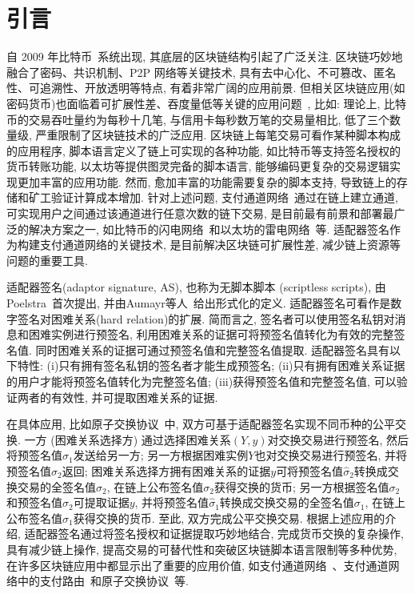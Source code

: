 \documentclass[review]{jcr}
\begin{document}

\section{引言}
自 2009 年比特币~\cite{Nak08}系统出现, 其底层的区块链结构引起了广泛关注. 区块链巧妙地融合了密码、共识机制、P2P 网络等关键技术, 具有去中心化、不可篡改、匿名性、可追溯性、开放透明等特点, 有着非常广阔的应用前景. 但相关区块链应用(如密码货币)也面临着可扩展性差、吞度量低等关键的应用问题~\cite{BanoSAAMMD19,GudgeonMRMG19,ZamyatinAZKMKK19,AumayrEEFHMMR20,SG2018}, 比如: 理论上, 比特币的交易吞吐量约为每秒十几笔, 与信用卡每秒数万笔的交易量相比, 低了三个数量级, 严重限制了区块链技术的广泛应用. 区块链上每笔交易可看作某种脚本构成的应用程序, 脚本语言定义了链上可实现的各种功能, 如比特币等支持签名授权的货币转账功能, 以太坊等提供图灵完备的脚本语言, 能够编码更复杂的交易逻辑实现更加丰富的应用功能. 然而, 愈加丰富的功能需要复杂的脚本支持, 导致链上的存储和矿工验证计算成本增加. 针对上述问题, 支付通道网络~\cite{PC2018}通过在链上建立通道, 可实现用户之间通过该通道进行任意次数的链下交易, 是目前最有前景和部署最广泛的解决方案之一, 如比特币的闪电网络~\cite{PD2016}和以太坊的雷电网络~\cite{raidEX}等. 适配器签名作为构建支付通道网络的关键技术, 是目前解决区块链可扩展性差, 减少链上资源等问题的重要工具. 

适配器签名(adaptor signature, AS), 也称为无脚本脚本 (scriptless scripts), 由Poelstra~\cite{Poelstra2016}首次提出, 并由Aumayr等人~\cite{AumayrEEFHMMR20}给出形式化的定义. 适配器签名可看作是数字签名对困难关系(hard relation)的扩展. 简而言之, 签名者可以使用签名私钥对消息和困难实例进行预签名, 利用困难关系的证据可将预签名值转化为有效的完整签名值. 同时困难关系的证据可通过预签名值和完整签名值提取. 适配器签名具有以下特性: (i)只有拥有签名私钥的签名者才能生成预签名; (ii)只有拥有困难关系证据的用户才能将预签名值转化为完整签名值; (iii)获得预签名值和完整签名值, 可以验证两者的有效性, 并可提取困难关系的证据. 

在具体应用, 比如原子交换协议~\cite{Nolan2013,Poelstra2017,DeshpandeH20,Gugger20}中, 双方可基于适配器签名实现不同币种的公平交换. 一方 (困难关系选择方) 通过选择困难关系$(Y,y)$对交换交易进行预签名, 然后将预签名值$\hat{\sigma}_1$发送给另一方; 另一方根据困难实例$Y$也对交换交易进行预签名, 并将预签名值$\hat{\sigma}_2$返回;  困难关系选择方拥有困难关系的证据$y$可将预签名值$\hat{\sigma}_2$转换成交换交易的全签名值$\sigma_2$, 在链上公布签名值$\sigma_2$获得交换的货币; 另一方根据签名值$\sigma_2$和预签名值$\hat{\sigma}_2$可提取证据$y$, 并将预签名值$\hat{\sigma}_1$转换成交换交易的全签名值$\sigma_1$, 在链上公布签名值$\sigma_1$获得交换的货币. 至此, 双方完成公平交换交易. 根据上述应用的介绍, 适配器签名通过将签名授权和证据提取巧妙地结合, 完成货币交换的复杂操作, 具有减少链上操作, 提高交易的可替代性和突破区块链脚本语言限制等多种优势, 在许多区块链应用中都显示出了重要的应用价值, 如支付通道网络~\cite{DeckerW15,PC2018,AumayrEEFHMMR20}、支付通道网络中的支付路由~\cite{EckeyFHR20,MalavoltaMSKM19,MillerBBKM19}和原子交换协议~\cite{Nolan2013,Poelstra2017,DeshpandeH20,Gugger20}等. 
\end{document}
